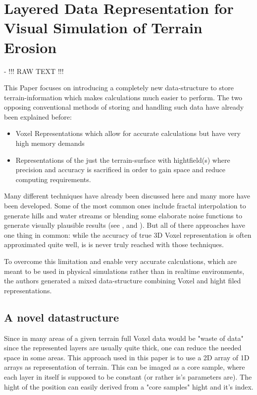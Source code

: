 \section{Layered Data Representation for Visual Simulation of Terrain Erosion}

\cite{marechal2010heat} - !!! RAW TEXT !!!

This Paper focuses on introducing a completely new data-structure to store terrain-information which makes calculations much easier to perform. The two opposing conventional methods of storing and handling such data have already been explained before:
\begin{itemize}
	\item Voxel Representations which allow for accurate calculations but have very high memory demands
	\item Representations of the just the terrain-surface with hightfield(s) where precision and accuracy is sacrificed in order to gain space and reduce computing requirements.
\end{itemize}

Many different techniques have already been discussed here and many more have been developed. Some of the most common ones include fractal interpolation to generate hills and water streams \cite{kelley1988terrain} or blending some elaborate noise functions to generate visually plausible results (see \cite{eckbert2000simulating}, \cite{musgrave1989synthesis} and \cite{musgrave1999towards}). But all of there approaches have one thing in common: while the accuracy of true 3D Voxel representation is often approximated quite well, is is never truly reached with those techniques.

To overcome this limitation and enable very accurate calculations, which are meant to be used in physical simulations rather than in realtime environments, the authors generated a mixed data-structure combining Voxel and hight filed representations.

\subsection{A novel datastructure}
Since in many areas of a given terrain full Voxel data would be "waste  of data" \cite{marechal2010heat} since the represented layers are usually quite thick, one can reduce the needed space in some areas. This approach used in this paper is to use a 2D array of 1D arrays as representation of terrain. This can be  imaged as a core sample, where each layer in itself is supposed to be constant (or rather is's parameters are). The hight of the position can easily derived from a "core samples" hight and it's index.

